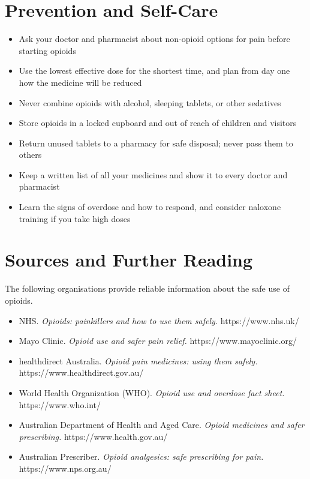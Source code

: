 \section*{Prevention and Self-Care}
\begin{itemize}
    \item Ask your doctor and pharmacist about non-opioid options for pain before starting opioids
    \item Use the lowest effective dose for the shortest time, and plan from day one how the medicine will be reduced
    \item Never combine opioids with alcohol, sleeping tablets, or other sedatives
    \item Store opioids in a locked cupboard and out of reach of children and visitors
    \item Return unused tablets to a pharmacy for safe disposal; never pass them to others
    \item Keep a written list of all your medicines and show it to every doctor and pharmacist
    \item Learn the signs of overdose and how to respond, and consider naloxone training if you take high doses
\end{itemize}

\section*{Sources and Further Reading}
The following organisations provide reliable information about the safe use of opioids.

\begin{itemize}
    \item NHS. \textit{Opioids: painkillers and how to use them safely.} https://www.nhs.uk/
    \item Mayo Clinic. \textit{Opioid use and safer pain relief.} https://www.mayoclinic.org/
    \item healthdirect Australia. \textit{Opioid pain medicines: using them safely.} https://www.healthdirect.gov.au/
    \item World Health Organization (WHO). \textit{Opioid use and overdose fact sheet.} https://www.who.int/
    \item Australian Department of Health and Aged Care. \textit{Opioid medicines and safer prescribing.} https://www.health.gov.au/
    \item Australian Prescriber. \textit{Opioid analgesics: safe prescribing for pain.} https://www.nps.org.au/
\end{itemize}
\clearpage

